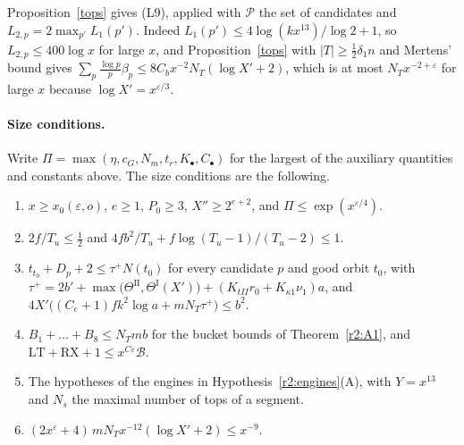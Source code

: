 Proposition~\ref{tops} gives (L9), applied with $\mathcal P$ the set of candidates and $L_{2,p}=2\max_{p'}L_1(p')$. Indeed $L_1(p')\le4\log(kx^{13})/\log2+1$, so $L_{2,p}\le400\log x$ for large $x$, and Proposition~\ref{tops} with $\lvert T\rvert\ge\frac12\delta_1n$ and Mertens' bound gives $\sum_p\frac{\log p}p\beta_p\le8C_bx^{-2}N_T(\log X'+2)$, which is at most $N_Tx^{-2+\varepsilon}$ for large $x$ because $\log X'=x^{\varepsilon/3}$.

\paragraph{Size conditions.} Write $\Pi=\max(\eta,c_G,N_m,t_r,K_\bullet,C_\bullet)$ for the largest of the auxiliary quantities and constants above. The size conditions are the following.
\begin{enumerate}
\item[(Z1)] $x\ge x_0(\varepsilon,o)$, $e\ge1$, $P_0\ge3$, $X''\ge2^{e+2}$, and $\Pi\le\exp(x^{\varepsilon/4})$.
\item[(Z2)] $2f/T_u\le\frac12$ and $4fb^2/T_u+f\log(T_u-1)/(T_u-2)\le1$.
\item[(Z3)] $t_{t_0}+D_p+2\le\tau^+N(t_0)$ for every candidate $p$ and good orbit $t_0$, with $\tau^+=2b'+\max\big(\Theta^{\mathrm{II}},\Theta^{\mathrm I}(X')\big)+(K_{tII}r_0+K_{\kappa1}\nu_1)a$, and $4X'\big((C_e+1)fk^2\log a+mN_T\tau^+\big)\le b^2$.
\item[(Z4)] $B_1+\dots+B_8\le N_Tmb$ for the bucket bounds of Theorem~\ref{r2:A1}, and $\mathrm{LT}+\mathrm{RX}+1\le x^{C\varepsilon}\mathcal B$.
\item[(Z5)] The hypotheses of the engines in Hypothesis~\ref{r2:engines}(A), with $Y=x^{13}$ and $N_s$ the maximal number of tops of a segment.
\item[(Z9)] $(2x^\varepsilon+4)\,mN_Tx^{-12}(\log X'+2)\le x^{-9}$.
\end{enumerate}

